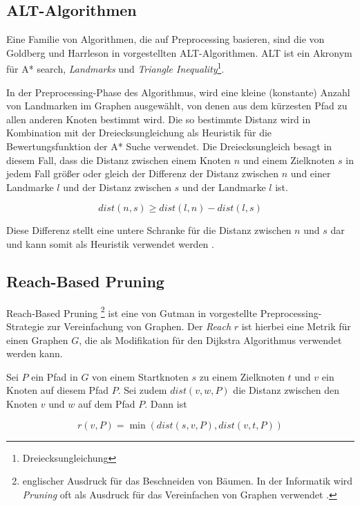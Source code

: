 \subsection{ALT-Algorithmen}
Eine Familie von Algorithmen, die auf Preprocessing basieren, sind die von Goldberg und Harrleson in \cite{Goldberg2005} vorgestellten ALT-Algorithmen. ALT ist ein Akronym für A* search, \textit{Landmarks} und \textit{Triangle Inequality}\footnote{Dreiecksungleichung}. 

In der Preprocessing-Phase des Algorithmus, wird eine kleine (konstante) Anzahl von Landmarken im Graphen ausgewählt, von denen aus dem kürzesten Pfad zu allen anderen Knoten bestimmt wird. Die so bestimmte Distanz wird in Kombination mit der Dreiecksungleichung als Heuristik für die Bewertungsfunktion der A* Suche verwendet. 
\newpage
Die Dreiecksungleich besagt in diesem Fall, dass die Distanz zwischen einem Knoten $n$ und einem Zielknoten $s$ in jedem Fall größer oder gleich der Differenz  der Distanz zwischen $n$ und einer Landmarke $l$ und der Distanz zwischen $s$ und der Landmarke $l$ ist.

\begin{equation} \label{eq:3.2}
	dist(n,s) \ge dist(l,n)-dist(l,s)
\end{equation}


Diese Differenz stellt eine untere Schranke für die Distanz zwischen $n$ und $s$ dar und kann somit als Heuristik verwendet werden \cite{Goldberg2005}.

\subsection{Reach-Based Pruning}
Reach-Based Pruning \footnote{englischer Ausdruck für das Beschneiden von Bäumen. In der Informatik wird \textit{Pruning} oft als Ausdruck für das Vereinfachen von Graphen verwendet \cite{Wikipedia:00}.} ist eine von Gutman in \cite{Gutman2004} vorgestellte Preprocessing-Strategie zur Vereinfachung von Graphen. Der \textit{Reach} $r$ ist hierbei eine Metrik für einen Graphen $G$, die als Modifikation für den Dijkstra Algorithmus verwendet werden kann. 

Sei $P$ ein Pfad in $G$ von einem Startknoten $s$ zu einem Zielknoten $t$ und $v$ ein Knoten auf diesem Pfad $P$. Sei zudem $dist(v,w,P)$ die Distanz zwischen den Knoten $v$ und $w$ auf dem Pfad $P$. Dann ist

\begin{equation} \label{eq:3.3}
	r(v,P) = \min{(dist(s,v,P), dist(v,t,P))}
\end{equation}

